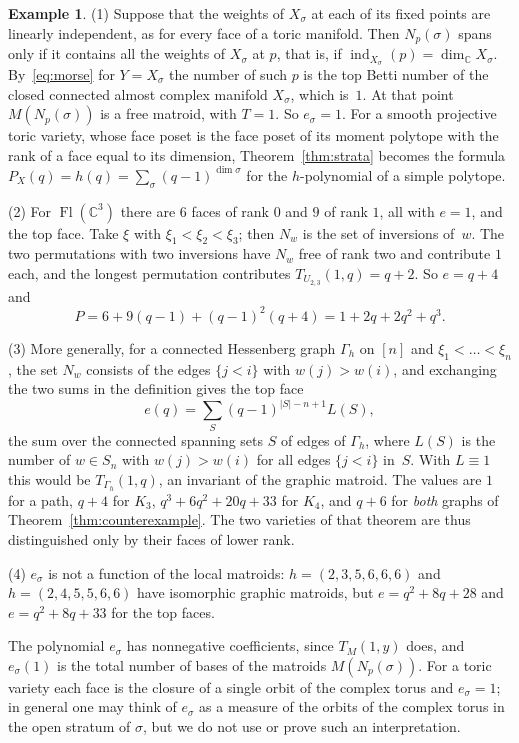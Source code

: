 \documentclass[11pt,a4paper]{article}
\numberwithin{equation}{section}
\theoremstyle{plain}
\theoremstyle{definition}
\newtheorem{example}[theorem]{Example}
\theoremstyle{remark}
\newcommand{\C}{\mathbb{C}}
\DeclareMathOperator{\Fl}{Fl}
\DeclareMathOperator{\ind}{ind}
\begin{document}
\begin{example}\label{ex:strata}
(1) Suppose that the weights of $X_\sigma$ at each of its fixed points are linearly independent, as for every face of a toric manifold. Then $N_p(\sigma)$ spans only if it contains all the weights of $X_\sigma$ at $p$, that is, if $\ind_{X_\sigma}(p)=\dim_\C X_\sigma$. By~\eqref{eq:morse} for $Y=X_\sigma$ the number of such $p$ is the top Betti number of the closed connected almost complex manifold $X_\sigma$, which is~$1$. At that point $M(N_p(\sigma))$ is a free matroid, with $T=1$. So $e_\sigma=1$. For a smooth projective toric variety, whose face poset is the face poset of its moment polytope with the rank of a face equal to its dimension, Theorem~\ref{thm:strata} becomes the formula $P_X(q)=h(q)=\sum_\sigma(q-1)^{\dim\sigma}$ for the $h$-polynomial of a simple polytope.

(2) For $\Fl(\C^3)$ there are $6$ faces of rank $0$ and $9$ of rank $1$, all with $e=1$, and the top face. Take $\xi$ with $\xi_1<\xi_2<\xi_3$; then $N_w$ is the set of inversions of~$w$. The two permutations with two inversions have $N_w$ free of rank two and contribute $1$ each, and the longest permutation contributes $T_{U_{2,3}}(1,q)=q+2$. So $e=q+4$ and
\[
P=6+9(q-1)+(q-1)^2(q+4)=1+2q+2q^2+q^3.
\]

(3) More generally, for a connected Hessenberg graph $\Gamma_h$ on $[n]$ and $\xi_1<\dots<\xi_n$, the set $N_w$ consists of the edges $\{j<i\}$ with $w(j)>w(i)$, and exchanging the two sums in the definition gives the top face
\[
e(q)=\sum_S(q-1)^{|S|-n+1}L(S),
\]
the sum over the connected spanning sets $S$ of edges of $\Gamma_h$, where $L(S)$ is the number of $w\in S_n$ with $w(j)>w(i)$ for all edges $\{j<i\}$ in~$S$. With $L\equiv1$ this would be $T_{\Gamma_h}(1,q)$, an invariant of the graphic matroid. The values are $1$ for a path, $q+4$ for $K_3$, $q^3+6q^2+20q+33$ for $K_4$, and $q+6$ for \emph{both} graphs of Theorem~\ref{thm:counterexample}. The two varieties of that theorem are thus distinguished only by their faces of lower rank.

(4) $e_\sigma$ is not a function of the local matroids: $h=(2,3,5,6,6,6)$ and $h=(2,4,5,5,6,6)$ have isomorphic graphic matroids, but $e=q^2+8q+28$ and $e=q^2+8q+33$ for the top faces.
\end{example}

The polynomial $e_\sigma$ has nonnegative coefficients, since $T_M(1,y)$ does, and $e_\sigma(1)$ is the total number of bases of the matroids $M(N_p(\sigma))$. For a toric variety each face is the closure of a single orbit of the complex torus and $e_\sigma=1$; in general one may think of $e_\sigma$ as a measure of the orbits of the complex torus in the open stratum of $\sigma$, but we do not use or prove such an interpretation.
\end{document}
